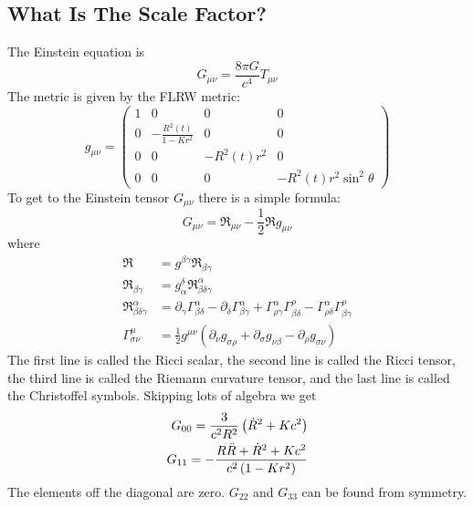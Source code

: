 \subsection{What Is The Scale Factor?}
The Einstein equation is
\begin{equation}
    G_{\mu\nu} = \frac{8\pi G}{c^4} T_{\mu\nu}
\end{equation}
The metric is given by the FLRW metric:
\begin{equation}
    g_{\mu\nu} = \begin{pmatrix}
        1 & 0 & 0 & 0 \\
        0 & -\frac{R^2(t)}{1-Kr^2} & 0 & 0 \\
        0 & 0 & -R^2(t)r^2 & 0 \\
        0 & 0 & 0 & -R^2(t)r^2\sin^2\theta
    \end{pmatrix}
\end{equation}
To get to the Einstein tensor \(G_{\mu\nu}\) there is a simple formula:
\begin{equation}
    G_{\mu\nu} = \mathfrak{R}_{\mu\nu} - \frac{1}{2}\mathfrak{R}g_{\mu\nu}
\end{equation} 
where
\begin{align}
    \mathfrak{R} &= g^{\beta\gamma}\mathfrak{R}_{\beta\gamma} \\
    \mathfrak{R}_{\beta\gamma} &= g_\alpha^\delta \mathfrak{R}^\alpha_{\beta\delta\gamma} \\
    \mathfrak{R}^\alpha_{\beta\delta\gamma} &= \partial_\gamma \Gamma^\alpha_{\beta\delta} - \partial_\delta \Gamma^\alpha_{\beta\gamma} + \Gamma^\alpha_{\rho\gamma}\Gamma^\rho_{\beta\delta} - \Gamma^\alpha_{\rho\delta}\Gamma^\rho_{\beta\gamma} \\
    \Gamma^\mu_{\sigma\nu} &= \frac{1}{2} g^{\mu\nu}\left(\partial_\nu g_{\sigma\rho} + \partial_\sigma g_{\nu\beta} - \partial_\rho g_{\sigma\nu}\right)
\end{align}
The first line is called the Ricci scalar, the second line is called the Ricci tensor, the third line is called the Riemann curvature tensor, and the last line is called the Christoffel symbols. Skipping lots of algebra we get
\begin{align}
    G_{00} = \frac{3}{c^2 R^2}\left(\dot{R}^2+Kc^2\right) \\
    G_{11} = -\frac{R\ddot{R}+\dot{R}^2+Kc^2}{c^2\left(1-Kr^2\right)}
\end{align}
The elements off the diagonal are zero. \(G_{22}\) and \(G_{33}\) can be found from symmetry.
